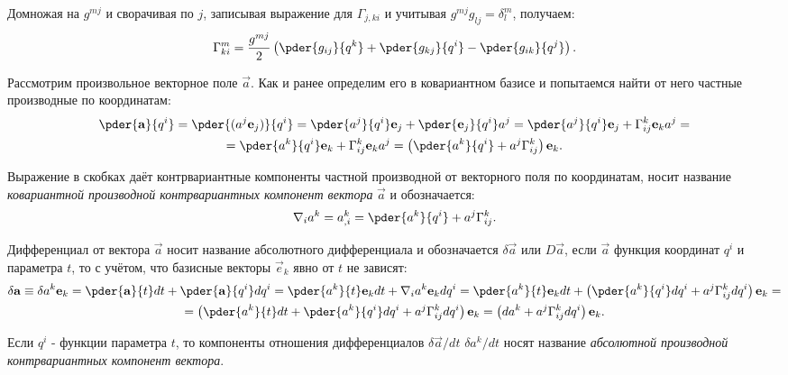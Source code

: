 Домножая на \( g^{mj} \) и сворачивая по \( j \), записывая выражение для
\( \Gamma_{j,ki} \) и учитывая \( g^{mj}g_{lj} = \delta^m_l \), получаем:
\[
    \Gamma^m_{ki} = \frac{g^{mj}}{2}\left(
        \pder{g_{ij}}{q^k}+
        \pder{g_{kj}}{q^i}-
        \pder{g_{ik}}{q^j}   
        \right).
\]  

Рассмотрим произвольное векторное поле \( \vec{a} \). Как и ранее определим его
в ковариантном базисе и попытаемся найти от него частные производные по
координатам:
\begin{gather*}
    \pder{\vec{a}}{q^i} = 
    \pder{(a^j \vec{e}_{j})}{q^i} = 
    \pder{a^j}{q^i}\vec{e}_{j} + \pder{ \vec{e}_{j}}{q^i} a^j =
    \pder{a^j}{q^i}\vec{e}_{j} + \Gamma^k_{ij} \vec{e}_{k} a^j =\\=
    \pder{a^k}{q^i}\vec{e}_{k} + \Gamma^k_{ij} \vec{e}_{k} a^j =
    \left(\pder{a^k}{q^i} + a^j \Gamma^k_{ij}\right)\vec{e}_{k}.
\end{gather*}

Выражение в скобках даёт контрвариантные компоненты частной производной от
векторного поля по координатам, носит название \emph{ковариантной производной
контрвариантных компонент вектора } \( \vec{a} \) и обозначается:
\[
    \nabla_i a^k = a^k_{,i} = \pder{a^k}{q^i} + a^j \Gamma^k_{ij}.
\]
    
Дифференциал от вектора \( \vec{a} \) носит название абсолютного дифференциала
и обозначается \( \delta  \vec{a} \) или \( D  \vec{a} \), если \( \vec{a} \)
функция координат \( q^i \) и параметра \( t \), то с учётом, что базисные
векторы \( \vec{e}_{k} \) явно от \( t \) не зависят:
\begin{gather*}
    \delta  \vec{a} \equiv \delta a^k \vec{e}_{k}= 
    \pder{\vec{a}}{t} dt + \pder{ \vec{a}}{q^i} dq^i = 
    \pder{a^k}{t} \vec{e}_{k} dt  + \nabla_i a^k \vec{e}_{k} dq^i =
    \pder{a^k}{t}\vec{e}_{k} dt  + \left(\pder{a^k}{q^i}dq^i +
    a^j \Gamma^k_{ij} dq^i\right) \vec{e}_{k} = \\ =
    \left(\pder{a^k}{t} dt+\pder{a^k}{q^i}dq^i +
    a^j \Gamma^k_{ij} dq^i\right) \vec{e}_{k} = 
    \left(d{a^k} + a^j \Gamma^k_{ij} dq^i\right) \vec{e}_{k}.
\end{gather*}
    
Если \( q^i \) - функции параметра \( t \), то компоненты отношения
дифференциалов \( \delta\vec{a}/dt \) \( \delta a^k/dt \) носят название
\emph{абсолютной производной контрвариантных компонент вектора}.

\newpage
